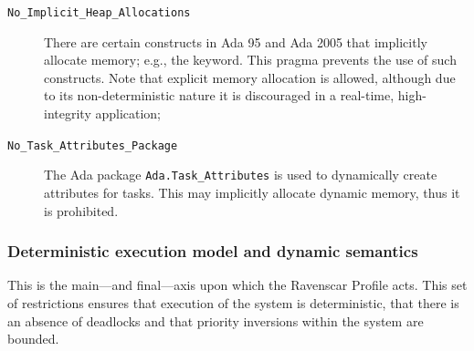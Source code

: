 \begin{description}
\item[\texttt{No\_Implicit\_Heap\_Allocations}] There are certain
  constructs in Ada 95 and Ada 2005 that implicitly allocate memory;
  e.g., the  keyword. This pragma prevents the use of such
  constructs. Note that explicit memory allocation is allowed,
  although due to its non-deterministic nature it is discouraged in a
  real-time, high-integrity application;

\item[\texttt{No\_Task\_Attributes\_Package}] The Ada package
  \texttt{Ada.Task\_Attributes} is used to dynamically create
  attributes for tasks. This may implicitly allocate dynamic memory,
  thus it is prohibited.
\end{description}

\subsubsection{Deterministic execution model and dynamic semantics}
This is the main---and final---axis upon which the Ravenscar Profile
acts. This set of restrictions ensures that execution of the system is
deterministic, that there is an absence of deadlocks and that priority
inversions within the system are bounded.

